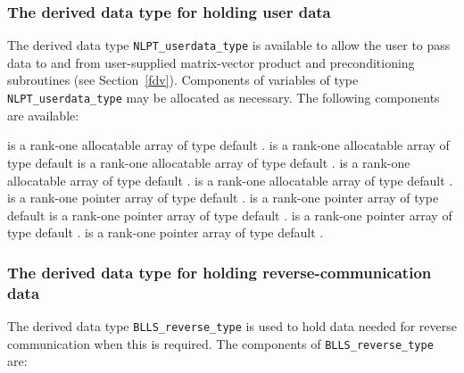 \documentclass{galahad}
\newcommand{\packagename}{BLLS}
\begin{document}

\subsubsection{The derived data type for holding user data}\label{typeuserdata}
The derived data type
{\tt NLPT\_userdata\_type}
is available to allow the user to pass data to and from user-supplied
matrix-vector product and preconditioning
subroutines (see Section~\ref{fdv}).
Components of variables of type {\tt NLPT\_userdata\-\_type} may be allocated as
necessary. The following components are available:

\begin{description}
 is a rank-one allocatable array of type default \integer.
 is a rank-one allocatable array of type default  \realdp
{} is a rank-one allocatable array of type default \complexdp.
 is a rank-one allocatable array of type default \character.
 is a rank-one allocatable array of type default \logical.
 is a rank-one pointer array of type default \integer.
 is a rank-one pointer array of type default  \realdp
{} is a rank-one pointer array of type default \complexdp.
 is a rank-one pointer array of type default \character.
 is a rank-one pointer array of type default \logical.
\end{description}


\subsubsection{The derived data type for holding reverse-communication data}\label{typereverse}
The derived data type
{\tt \packagename\_reverse\_type}
is used to hold data needed for reverse communication when this is
required.
The components of
{\tt \packagename\_reverse\_type}
are:
\end{document}
